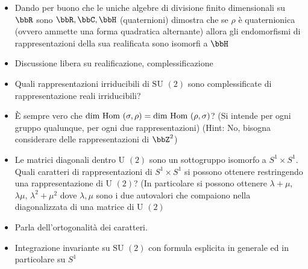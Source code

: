 \documentclass[a4paper,NoNotes,GeneralMath]{stdmdoc}
\newcommand{\SU}{\text{SU }}
\newcommand{\U}{\text{U }}
\newcommand{\Hom}{\text{Hom }}
\begin{document}
\begin{itemize}
		\item Dando per buono che le uniche algebre di divisione finito dimensionali su $\bbR$ sono $\bbR, \bbC, \bbH$ (quaternioni) dimostra che se $\rho$ è quaternionica (ovvero ammette una forma quadratica alternante) allora gli endomorfismi di rappresentazioni della sua realificata sono isomorfi a $\bbH$
		\item Discussione libera su realificazione, complessificazione
		\item Quali rappresentazioni irriducibili di $\SU(2)$ sono complessificate di rappresentazione reali irriducibili?
		\item È sempre vero che $\Dim \Hom(\sigma, \rho) = \Dim \Hom(\rho, \sigma)$? (Si intende per ogni gruppo qualunque, per ogni due rappresentazioni) (Hint: No, bisogna considerare delle rappresentazioni di $\bbZ^2$)
		\item Le matrici diagonali dentro $\U(2)$ sono un sottogruppo isomorfo a $S^1 \times S^1$. Quali caratteri di rappresentazioni di $S^1 \times S^1$ si possono ottenere restringendo una rappresentazione di $\U(2)$? (In particolare si possono ottenere $\lambda + \mu$, $\lambda\mu$, $\lambda^2 + \mu^2$ dove $\lambda, \mu$ sono i due autovalori che compaiono nella diagonalizzata di una matrice di $\U(2)$
		\item Parla dell'ortogonalità dei caratteri.
		\item Integrazione invariante su $\SU(2)$ con formula esplicita in generale ed in particolare su $S^1$
	\end{itemize}
\end{document}
